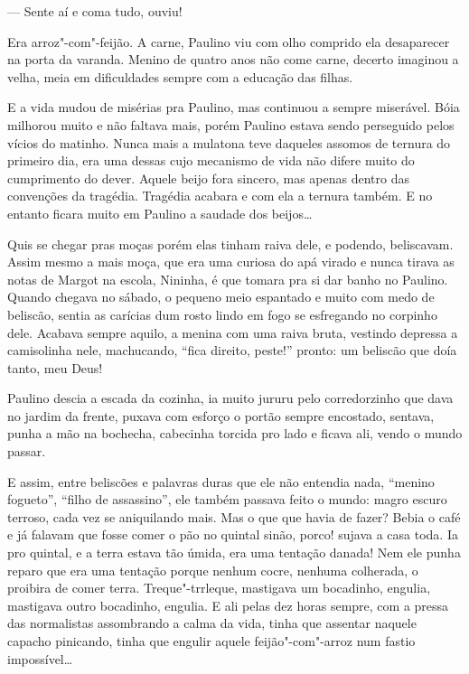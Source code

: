 --- Sente aí e coma tudo, ouviu!

Era arroz"-com"-feijão. A carne, Paulino viu com olho comprido ela
desaparecer na porta da varanda. Menino de quatro anos não come carne,
decerto imaginou a velha, meia em dificuldades sempre com a educação das
filhas.

E a vida mudou de misérias pra Paulino, mas continuou a sempre
miserável. Bóia milhorou muito e não faltava mais, porém Paulino estava
sendo perseguido pelos vícios do matinho. Nunca mais a mulatona teve
daqueles assomos de ternura do primeiro dia, era uma dessas cujo
mecanismo de vida não difere muito do cumprimento do dever. Aquele beijo
fora sincero, mas apenas dentro das convenções da tragédia. Tragédia
acabara e com ela a ternura também. E no entanto ficara muito em Paulino
a saudade dos beijos\ldots{}

Quis se chegar pras moças porém elas tinham raiva dele, e podendo,
beliscavam. Assim mesmo a mais moça, que era uma curiosa do apá virado e
nunca tirava as notas de Margot na escola, Nininha, é que tomara pra si
dar banho no Paulino. Quando chegava no sábado, o pequeno meio espantado
e muito com medo de beliscão, sentia as carícias dum rosto lindo em fogo
se esfregando no corpinho dele. Acabava sempre aquilo, a menina com uma
raiva bruta, vestindo depressa a camisolinha nele, machucando, ``fica
direito, peste!'' pronto: um beliscão que doía tanto, meu Deus!

Paulino descia a escada da cozinha, ia muito jururu pelo corredorzinho
que dava no jardim da frente, puxava com esforço o portão sempre
encostado, sentava, punha a mão na bochecha, cabecinha torcida pro lado
e ficava ali, vendo o mundo passar.

E assim, entre beliscões e palavras duras que ele não entendia nada,
``menino fogueto'', ``filho de assassino'', ele também passava feito o
mundo: magro escuro terroso, cada vez se aniquilando mais. Mas o que que
havia de fazer? Bebia o café e já falavam que fosse comer o pão no
quintal sinão, porco! sujava a casa toda. Ia pro quintal, e a terra
estava tão úmida, era uma tentação danada! Nem ele punha reparo que era
uma tentação porque nenhum cocre, nenhuma colherada, o proibira de comer
terra. Treque"-trrleque, mastigava um bocadinho, engulia, mastigava outro
bocadinho, engulia. E ali pelas dez horas sempre, com a pressa das
normalistas assombrando a calma da vida, tinha que assentar naquele
capacho pinicando, tinha que engulir aquele feijão"-com"-arroz num fastio
impossível\ldots{}

